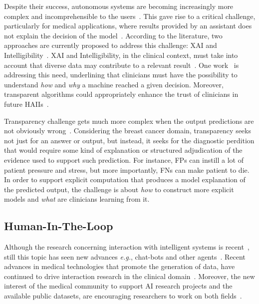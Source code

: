 Despite their success, autonomous systems are becoming increasingly more complex and incomprehensible to the users~\cite{holzinger2019causability}.
This gave rise to a critical challenge, particularly for medical applications, where results provided by an assistant does not explain the decision of the model~\cite{shah2019artificial}.
According to the literature, two approaches are currently proposed to address this challenge: \ac{XAI} and Intelligibility~\cite{gunning2017explainable, miller2018explanation}.
\ac{XAI} and Intelligibility, in the clinical context, must take into account that diverse data may contribute to a relevant result~\cite{Bharadhwaj:2019:ERS:3308557.3308699}.
One work~\cite{holzinger2018current} is addressing this need, underlining that clinicians must have the possibility to understand {\it how} and {\it why} a machine reached a given decision.
Moreover, transparent algorithms could appropriately enhance the trust of clinicians in future \acp{HAII}~\cite{Dominguez:2019:EEA:3301275.3302274, Weisz:2019:BTS:3301275.3302290}.

Transparency challenge gets much more complex when the output predictions are not obviously wrong~\cite{holzinger2018current}.
Considering the breast cancer domain, transparency seeks not just for an answer or output, but instead, it seeks for the diagnostic perdition that would require some kind of explanation or structured adjudication of the evidence used to support such prediction.
For instance, \acp{FP} can instill a lot of patient pressure and stress, but more importantly, \acp{FN} can make patient to die.
In order to support explicit computation that produces a model explanation of the predicted output, the challenge is about {\it how} to construct more explicit models and {\it what} are clinicians learning from it.

\subsection{Human-In-The-Loop}
\label{sec:app002002002}

Although the research concerning interaction with intelligent systems is recent~\cite{burr2018analysis, johnson2016face}, still this topic has seen new advances {\it e.g.}, chat-bots and other agents~\cite{chattopadhyay2017evaluating, miller2019intrinsically, mou2017media}.
Recent advances in medical technologies that promote the generation of data, have continued to drive interaction research in the clinical domain~\cite{azuaje2019artificial, chin2018clinical}.
Moreover, the new interest of the medical community to support \ac{AI} research projects and the available public datasets, are encouraging researchers to work on both fields~\cite{lau2018dataset, price2018big}.

